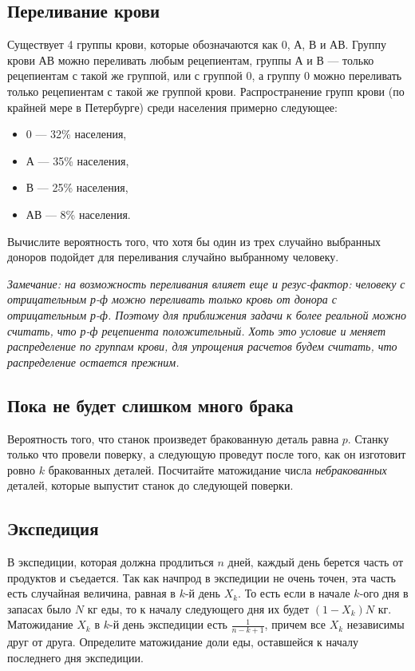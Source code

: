 \documentclass[12pt]{article}
\begin{document}
\subsection{Переливание крови}
Существует 4 группы крови, которые обозначаются как 0, А, В и АВ. Группу крови АВ можно переливать любым рецепиентам, группы А и В --- только рецепиентам с такой же группой, или с группой 0, а группу 0 можно переливать только рецепиентам с такой же группой крови. Распространение групп крови (по крайней мере в Петербурге) среди населения примерно следующее:
\begin{itemize}
    \item 0 --- 32\% населения,
    \item А --- 35\% населения,
    \item В --- 25\% населения,
    \item АВ --- 8\% населения.
\end{itemize}
Вычислите вероятность того, что хотя бы один из трех случайно выбранных доноров подойдет для переливания случайно выбранному человеку. 

\emph{Замечание: на возможность переливания влияет еще и резус-фактор: человеку с отрицательным р-ф можно переливать только кровь от донора с отрицательным р-ф. Поэтому для приближения задачи к более реальной можно считать, что р-ф рецепиента положительный. Хоть это условие и меняет распределение по группам крови, для упрощения расчетов будем считать, что распределение остается прежним.}

\subsection{Пока не будет слишком много брака}
Вероятность того, что станок произведет бракованную деталь равна $p$. Станку только что провели поверку, а следующую проведут после того, как он изготовит ровно $k$ бракованных деталей. Посчитайте матожидание числа \emph{небракованных} деталей, которые выпустит станок до следующей поверки.

\subsection{Экспедиция}
В экспедиции, которая должна продлиться $n$ дней, каждый день берется часть от продуктов и съедается. Так как начпрод в экспедиции не очень точен, эта часть есть случайная величина, равная в $k$-й день $X_k$. То есть если в начале $k$-ого дня в запасах было $N$ кг еды, то к началу следующего дня их будет $(1 - X_k)N$ кг. Матожидание $X_k$ в $k$-й день экспедиции есть $\frac{1}{n - k + 1}$, причем все $X_k$ независимы друг от друга. Определите матожидание доли еды, оставшейся к началу последнего дня экспедиции.
\end{document}
